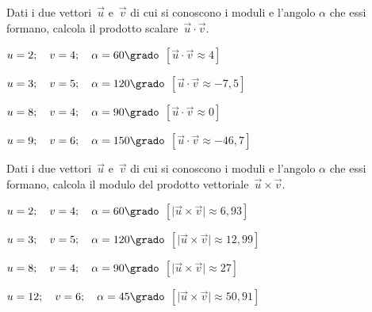 \begin{esercizio}
\label{ese:vett.8}
Dati i due vettori~\(\vec{u}\) e~\(\vec{v}\) di cui si conoscono i moduli e 
l'angolo \(\alpha\) che essi formano, 
calcola il prodotto scalare~\(\vec{u} \cdot \vec{v}\).
\begin{enumeratea}
\item \(u=2; \quad v=4; \quad \alpha=60\grado\) 
 \hfill \(\left[\vec{u} \cdot \vec{v} \approx 4\right]\)
\item \(u=3; \quad v=5; \quad \alpha=120\grado\) 
 \hfill \(\left[\vec{u} \cdot \vec{v} \approx -7,5\right]\)
\item \(u=8; \quad v=4; \quad \alpha=90\grado\) 
 \hfill \(\left[\vec{u} \cdot \vec{v} \approx 0\right]\)
\item \(u=9; \quad v=6; \quad \alpha=150\grado\) 
 \hfill \(\left[\vec{u} \cdot \vec{v} \approx -46,7\right]\)
\end{enumeratea}
\end{esercizio}

\begin{esercizio}
\label{ese:vett.9}
Dati i due vettori~\(\vec{u}\) e~\(\vec{v}\) di cui si conoscono i moduli e 
l'angolo \(\alpha\) che essi formano, 
calcola il modulo del prodotto vettoriale~\(\vec{u} \times \vec{v}\).
\begin{enumeratea}
\item \(u=2; \quad v=4; \quad \alpha=60\grado\) 
 \hfill \(\left[\lvert\vec{u} \times \vec{v}\rvert \approx 6,93\right]\)
\item \(u=3; \quad v=5; \quad \alpha=120\grado\) 
 \hfill \(\left[\lvert\vec{u} \times \vec{v}\rvert \approx 12,99\right]\)
\item \(u=8; \quad v=4; \quad \alpha=90\grado\) 
 \hfill \(\left[\lvert\vec{u} \times \vec{v}\rvert \approx 27\right]\)
\item \(u=12; \quad v=6; \quad \alpha=45\grado\) 
 \hfill \(\left[\lvert\vec{u} \times \vec{v}\rvert \approx 50,91\right]\)
\end{enumeratea}
\end{esercizio}

